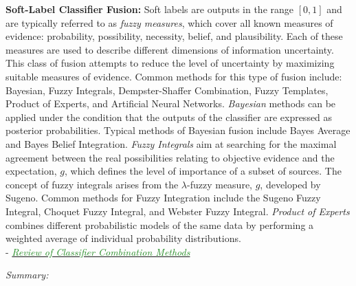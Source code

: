 \documentclass[]{article}
\newcommand{\paperentry}[4]{
            \hangindent=1cm
            \cite{#1} - \href{run:../References/#3}{\textcolor{ForestGreen}{\textit{#2}}}
            
            \noindent            
            \begin{minipage}[t]{0.1\linewidth}\hfill\end{minipage}
            \begin{minipage}[t]{0.8\linewidth}\textcolor{NavyBlue}{{\textit{Summary:}}}#4\end{minipage}
            \vspace{.25cm}
          }
\begin{document}
			\noindent
			\textbf{Soft-Label Classifier Fusion:} \newline
			Soft labels are outputs in the range $[0,1]$ and are typically referred to  as \textit{fuzzy measures}, which cover all known measures of  evidence: probability, possibility, necessity, belief, and plausibility.  Each of these measures are used to describe different dimensions of information uncertainty.  This class of fusion attempts to reduce the level of uncertainty by maximizing suitable measures of evidence.  Common methods for this type of fusion include: Bayesian, Fuzzy Integrals, Dempster-Shaffer Combination, Fuzzy Templates, Product of  Experts, and Artificial Neural Networks.  \textit{Bayesian} methods can be applied under the condition that the outputs of the classifier are expressed as posterior probabilities.  Typical methods of Bayesian fusion include Bayes Average and Bayes Belief Integration. \textit{Fuzzy Integrals} aim at searching for the maximal agreement between  the real possibilities  relating to objective evidence and the expectation, $g$, which defines the level of importance of a subset of sources.  The concept of fuzzy integrals arises from the $\lambda$-fuzzy measure, $g$, developed by Sugeno.  Common methods for Fuzzy Integration include the Sugeno Fuzzy Integral, Choquet Fuzzy Integral, and Webster Fuzzy Integral.  \textit{Product of  Experts} combines different probabilistic models of the same data by performing a weighted average of individual probability distributions. \\
			
			
			
			
			\paperentry{Tulyakov2008ReviewClassifierCombinationMethods}
			{Review of Classifier Combination Methods}
			{Fusion/Reviews/Tulyakov2008ReviewClassifierCombinationMethods.pdf}
			{}\newline
			
\end{document}
